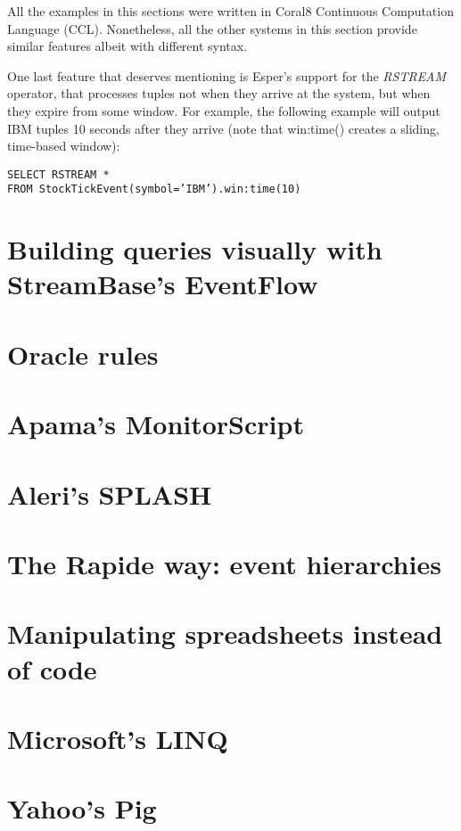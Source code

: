 \documentclass[twoside]{report}
\begin{document}
All the examples in this sections were written in Coral8 Continuous Computation Language (CCL). Nonetheless, all the other systems in this section provide similar features albeit with different syntax.

One last feature that deserves mentioning is Esper's support for the \emph{RSTREAM} operator, that processes tuples not when they arrive at the system, but when they expire from some window. For example, the following example will output IBM tuples 10 seconds after they arrive (note that win:time() creates a sliding, time-based window):

\begin{verbatim}
SELECT RSTREAM *
FROM StockTickEvent(symbol=’IBM’).win:time(10)
\end{verbatim}



\section{Building queries visually with StreamBase's EventFlow}

\section{Oracle rules}

\section{Apama's MonitorScript}

\section{Aleri's SPLASH}

\section{The Rapide way: event hierarchies}

\section{Manipulating spreadsheets instead of code}

\section{Microsoft's LINQ}

\section{Yahoo's Pig}
\end{document}

